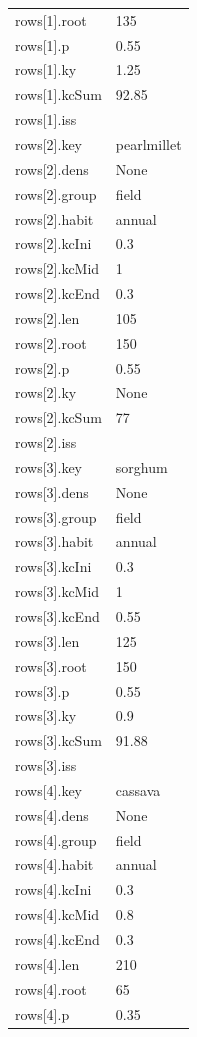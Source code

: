 {\begin{longtable}{p{}p{}}
{}rows[1].root & 135\\
{}rows[1].p & 0.55\\
{}rows[1].ky & 1.25\\
{}rows[1].kcSum & 92.85\\
{}rows[1].iss & \\
{}rows[2].key & pearlmillet\\
{}rows[2].dens & None\\
{}rows[2].group & field\\
{}rows[2].habit & annual\\
{}rows[2].kcIni & 0.3\\
{}rows[2].kcMid & 1\\
{}rows[2].kcEnd & 0.3\\
{}rows[2].len & 105\\
{}rows[2].root & 150\\
{}rows[2].p & 0.55\\
{}rows[2].ky & None\\
{}rows[2].kcSum & 77\\
{}rows[2].iss & \\
{}rows[3].key & sorghum\\
{}rows[3].dens & None\\
{}rows[3].group & field\\
{}rows[3].habit & annual\\
{}rows[3].kcIni & 0.3\\
{}rows[3].kcMid & 1\\
{}rows[3].kcEnd & 0.55\\
{}rows[3].len & 125\\
{}rows[3].root & 150\\
{}rows[3].p & 0.55\\
{}rows[3].ky & 0.9\\
{}rows[3].kcSum & 91.88\\
{}rows[3].iss & \\
{}rows[4].key & cassava\\
{}rows[4].dens & None\\
{}rows[4].group & field\\
{}rows[4].habit & annual\\
{}rows[4].kcIni & 0.3\\
{}rows[4].kcMid & 0.8\\
{}rows[4].kcEnd & 0.3\\
{}rows[4].len & 210\\
{}rows[4].root & 65\\
{}rows[4].p & 0.35\\

\end{longtable}}
